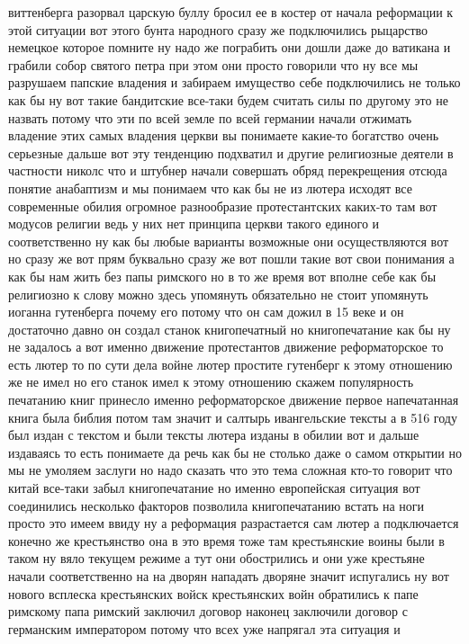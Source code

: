 виттенберга разорвал царскую буллу бросил ее в костер от начала реформации к
этой ситуации вот этого бунта народного сразу же подключились рыцарство немецкое
которое помните ну надо же пограбить они дошли даже до ватикана и грабили собор
святого петра при этом они просто говорили что ну все мы разрушаем папские
владения и забираем имущество себе подключились не только как бы ну вот такие
бандитские все-таки будем считать силы по другому это не назвать потому что эти
по всей земле по всей германии начали отжимать владение этих самых владения
церкви вы понимаете какие-то богатство очень серьезные дальше вот эту тенденцию
подхватил и другие религиозные деятели в частности николс что и штубнер начали
совершать обряд перекрещения отсюда понятие анабаптизм и мы понимаем что как бы
не из лютера исходят все современные обилия огромное разнообразие протестантских
каких-то там вот модусов религии ведь у них нет принципа церкви такого единого и
соответственно ну как бы любые варианты возможные они осуществляются вот но
сразу же вот прям буквально сразу же вот пошли такие вот свои понимания а как бы
нам жить без папы римского но в то же время вот вполне себе как бы религиозно к
слову можно здесь упомянуть обязательно не стоит упомянуть иоганна гутенберга
почему его потому что он сам дожил в 15 веке и он достаточно давно он создал
станок книгопечатный но книгопечатание как бы ну не задалось а вот именно
движение протестантов движение реформаторское то есть лютер то по сути дела
войне лютер простите гутенберг к этому отношению же не имел но его станок имел к
этому отношению скажем популярность печатанию книг принесло именно
реформаторское движение первое напечатанная книга была библия потом там значит и
салтырь ивангельские тексты а в 516 году был издан с текстом и были тексты
лютера изданы в обилии вот и дальше издаваясь то есть понимаете да речь как бы
не столько даже о самом открытии но мы не умоляем заслуги но надо сказать что
это тема сложная кто-то говорит что китай все-таки забыл книгопечатание но
именно европейская ситуация вот соединились несколько факторов позволила
книгопечатанию встать на ноги просто это имеем ввиду ну а реформация
разрастается сам лютер а подключается конечно же крестьянство она в это время
тоже там крестьянские воины были в таком ну вяло текущем режиме а тут они
обострились и они уже крестьяне начали соответственно на на дворян нападать
дворяне значит испугались ну вот нового всплеска крестьянских войск крестьянских
войн обратились к папе римскому папа римский заключил договор наконец заключили
договор с германским императором потому что всех уже напрягал эта ситуация и
